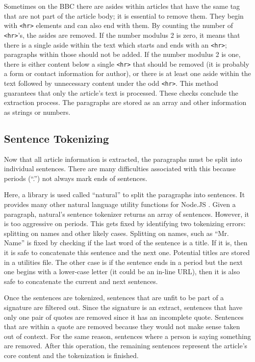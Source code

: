 \documentclass[11pt,titlepage]{report}
\begin{document}
Sometimes on the BBC there are asides within articles that have the same tag that are not part of the article body; it is essential to remove them. They begin with \lstinline|<hr>| elements and can also end with them. By counting the number of \lstinline|<hr>|'s, the asides are removed. If the number modulus 2 is zero, it means that there is a single aside within the text which starts and ends with an \lstinline|<hr>|; paragraphs within those should not be added. If the number modulus 2 is one, there is either content below a single \lstinline|<hr>| that should be removed (it is probably a form or contact information for author), or there is at least one aside within the text followed by unnecessary content under the odd \lstinline|<hr>|. This method guarantees that only the article's text is processed. These checks conclude the extraction process. The paragraphs are stored as an array and other information as strings or numbers.

\subsection{Sentence Tokenizing}
Now that all article information is extracted, the paragraphs must be split into individual sentences. There are many difficulties associated with this because periods (``.'') not always mark ends of sentences.

Here, a library is used called ``natural'' to split the paragraphs into sentences. It provides many other natural language utility functions for Node.JS \cite{natural_node}. Given a paragraph, natural's sentence tokenizer returns an array of sentences. However, it is too aggressive on periods. This gets fixed by identifying two tokenizing errors: splitting on names and other likely cases. Splitting on names, such as ``Mr. Name'' is fixed by checking if the last word of the sentence is a title. If it is, then it is safe to concatenate this sentence and the next one. Potential titles are stored in a utilities file. The other case is if the sentence ends in a period but the next one begins with a lower-case letter (it could be an in-line URL), then it is also safe to concatenate the current and next sentences. 

Once the sentences are tokenized, sentences that are unfit to be part of a signature are filtered out. Since the signature is an extract, sentences that have only one pair of quotes are removed since it has an incomplete quote. Sentences that are within a quote are removed because they would not make sense taken out of context. For the same reason, sentences where a person is saying something are removed. After this operation, the remaining sentences represent the article's core content and the tokenization is finished.
\end{document}
